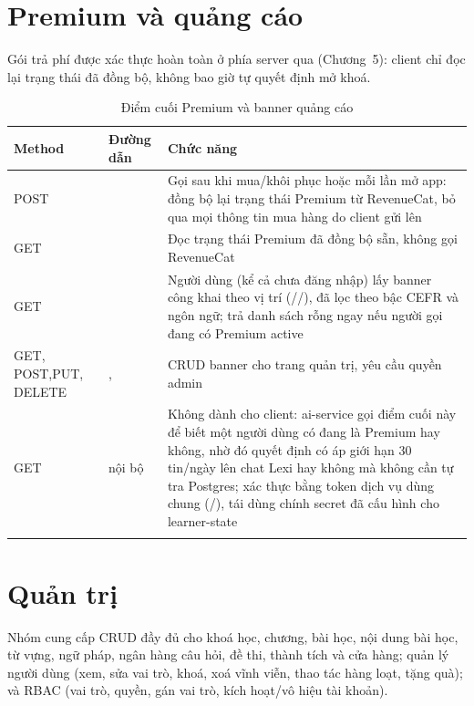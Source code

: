 \section{Premium và quảng cáo}

Gói trả phí được xác thực hoàn toàn ở phía server qua 
(Chương~5): client chỉ đọc lại trạng thái đã đồng bộ, không bao giờ tự quyết định mở khoá.

\begin{longtable}{L{2.8cm} L{6.0cm} L{4.8cm}}
\toprule
\textbf{Method} & \textbf{Đường dẫn} & \textbf{Chức năng}\\
\midrule
\endhead
POST &  & Gọi sau khi mua/khôi phục hoặc mỗi lần mở app: đồng bộ lại trạng thái Premium từ RevenueCat, bỏ qua mọi thông tin mua hàng do client gửi lên\\
GET &  & Đọc trạng thái Premium đã đồng bộ sẵn, không gọi RevenueCat\\
GET &  & Người dùng (kể cả chưa đăng nhập) lấy banner công khai theo vị trí (//), đã lọc theo bậc CEFR và ngôn ngữ; trả danh sách rỗng ngay nếu người gọi đang có Premium active\\
GET, POST,\newline PUT, DELETE & ,  & CRUD banner cho trang quản trị, yêu cầu quyền admin\\
GET & nội bộ  & Không dành cho client: ai-service gọi điểm cuối này để biết một người dùng có đang là Premium hay không, nhờ đó quyết định có áp giới hạn 30 tin/ngày lên chat Lexi hay không mà không cần tự tra Postgres; xác thực bằng token dịch vụ dùng chung (/), tái dùng chính secret đã cấu hình cho learner-state\\
\bottomrule
\caption{Điểm cuối Premium và banner quảng cáo}
\end{longtable}

\section{Quản trị}

Nhóm  cung cấp CRUD đầy đủ cho khoá học, chương, bài học, nội dung bài học,
từ vựng, ngữ pháp, ngân hàng câu hỏi, đề thi, thành tích và cửa hàng; quản lý người dùng
(xem, sửa vai trò, khoá, xoá vĩnh viễn, thao tác hàng loạt, tặng quà); và RBAC (vai trò,
quyền, gán vai trò, kích hoạt/vô hiệu tài khoản).


